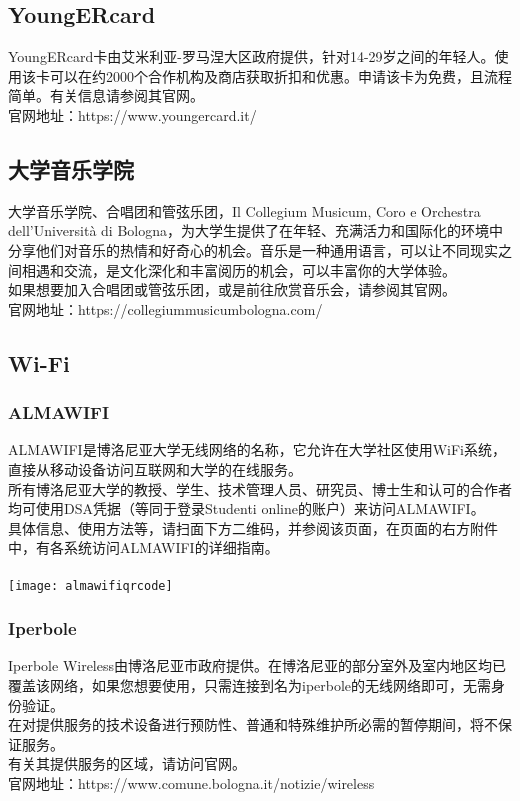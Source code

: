 \subsection{YoungERcard}
YoungERcard卡由艾米利亚-罗马涅大区政府提供，针对14-29岁之间的年轻人。使用该卡可以在约2000个合作机构及商店获取折扣和优惠。申请该卡为免费，且流程简单。有关信息请参阅其官网。\\
官网地址：https://www.youngercard.it/

\subsection{大学音乐学院}
大学音乐学院、合唱团和管弦乐团，Il Collegium Musicum, Coro e Orchestra dell’Università di Bologna，为大学生提供了在年轻、充满活力和国际化的环境中分享他们对音乐的热情和好奇心的机会。音乐是一种通用语言，可以让不同现实之间相遇和交流，是文化深化和丰富阅历的机会，可以丰富你的大学体验。\\
如果想要加入合唱团或管弦乐团，或是前往欣赏音乐会，请参阅其官网。\\
官网地址：https://collegiummusicumbologna.com/

\subsection{Wi-Fi}
\subsubsection{ALMAWIFI}
ALMAWIFI是博洛尼亚大学无线网络的名称，它允许在大学社区使用WiFi系统，直接从移动设备访问互联网和大学的在线服务。\\
所有博洛尼亚大学的教授、学生、技术管理人员、研究员、博士生和认可的合作者均可使用DSA凭据（等同于登录Studenti online的账户）来访问ALMAWIFI。\\
具体信息、使用方法等，请扫面下方二维码，并参阅该页面，在页面的右方附件中，有各系统访问ALMAWIFI的详细指南。\\
\\
\texttt{[image: almawifiqrcode]}
\subsubsection{Iperbole}
Iperbole Wireless由博洛尼亚市政府提供。在博洛尼亚的部分室外及室内地区均已覆盖该网络，如果您想要使用，只需连接到名为iperbole的无线网络即可，无需身份验证。\\
在对提供服务的技术设备进行预防性、普通和特殊维护所必需的暂停期间，将不保证服务。\\
有关其提供服务的区域，请访问官网。\\
官网地址：https://www.comune.bologna.it/notizie/wireless

